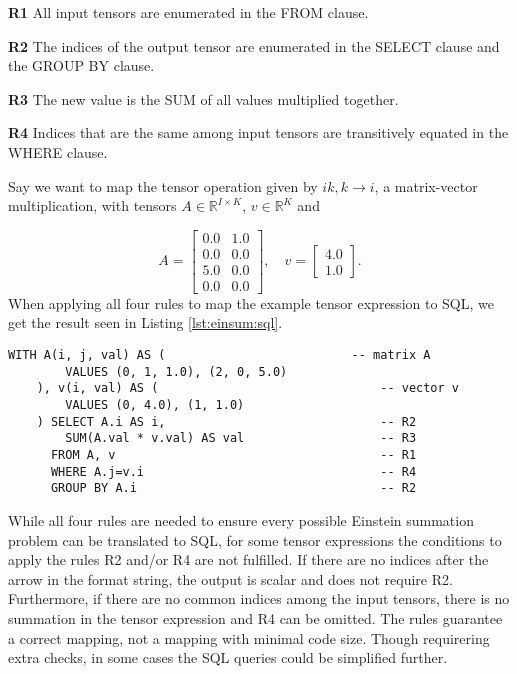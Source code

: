 \begin{description}
    \item \textbf{R1} All input tensors are enumerated in the FROM clause.
    \item \textbf{R2} The indices of the output tensor are enumerated in the SELECT clause
          and the GROUP BY clause.
    \item \textbf{R3} The new value is the SUM of all values multiplied together.
    \item \textbf{R4} Indices that are the same among input tensors are transitively equated
          in the WHERE clause.
\end{description}
%
Say we want to map the tensor operation given by $ik,k \rightarrow i$, a matrix-vector
multiplication, with tensors $A \in \mathbb{R}^{I \times K}$, $v \in \mathbb{R}^{K}$ and

\begin{equation*}
    A =
    \begin{bmatrix}
        0.0 & 1.0 \\
        0.0 & 0.0 \\
        5.0 & 0.0 \\
        0.0 & 0.0
    \end{bmatrix},
    \quad
    v =
    \begin{bmatrix}
        4.0 \\
        1.0
    \end{bmatrix}.
\end{equation*}
%
When applying all four rules to map the example tensor expression to SQL, we get the result
seen in Listing \ref{lst:einsum:sql}.

\begin{lstlisting}[caption={Einstein summation in SQL.}, captionpos={t}, label={lst:einsum:sql}]
    WITH A(i, j, val) AS (                          -- matrix A
        VALUES (0, 1, 1.0), (2, 0, 5.0)
    ), v(i, val) AS (                               -- vector v
        VALUES (0, 4.0), (1, 1.0)
    ) SELECT A.i AS i,                              -- R2
        SUM(A.val * v.val) AS val                   -- R3
      FROM A, v                                     -- R1
      WHERE A.j=v.i                                 -- R4
      GROUP BY A.i                                  -- R2
\end{lstlisting}
%
While all four rules are needed to ensure every possible Einstein summation problem
can be translated to SQL, for some tensor expressions the conditions to apply the rules
R2 and/or R4 are not fulfilled. If there are no indices after the arrow in the format
string, the output is scalar and does not require R2. Furthermore, if there are no common
indices among the input tensors, there is no summation in the tensor expression and R4
can be omitted. The rules guarantee a correct mapping, not a mapping with minimal code size.
Though requirering extra checks, in some cases the SQL queries could be simplified further.

